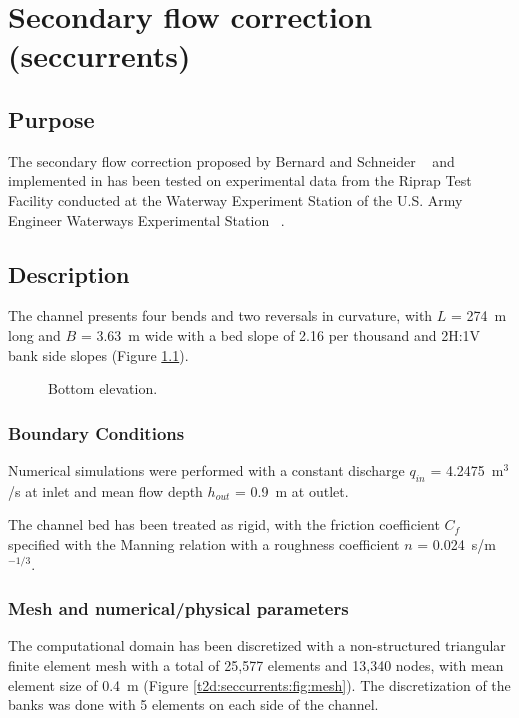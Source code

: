 \chapter{Secondary flow correction (seccurrents)}

\section{Purpose}

The secondary flow correction proposed by Bernard and Schneider
~\cite{bernard1992, finnie1999} and implemented in  has been tested
on experimental data from the Riprap Test Facility conducted at the Waterway
Experiment Station of the U.S. Army Engineer Waterways Experimental Station
~\cite{bernard1992}.

\section{Description}

The channel presents four bends and two reversals in curvature, with $L$ = 274~m
long and $B$ = 3.63~m wide with a bed slope of 2.16 per thousand
and 2H:1V bank side slopes (Figure \ref{t2d:seccurrents:fig:Bottom}).

\begin{figure}[!htbp]
 \centering
 \caption{Bottom elevation.}
 \label{t2d:seccurrents:fig:Bottom}
\end{figure}

\subsection{Boundary Conditions}

Numerical simulations were performed with a constant discharge $q_{in}$ = 4.2475~m$^3$/s
at inlet and mean flow depth $h_{out}$ = 0.9~m at outlet.

The channel bed has been treated as rigid, with the friction coefficient $C_f$
specified with the Manning relation with a roughness coefficient $n$ = 0.024~s/m$^{-1/3}$.

\subsection{Mesh and numerical/physical parameters}

The computational domain has been discretized with a non-structured triangular
finite element mesh with a total of 25,577 elements and 13,340 nodes,
with mean element size of 0.4~m (Figure \ref{t2d:seccurrents:fig:mesh}).
The discretization of the banks was done with 5 elements on each side of the channel.

